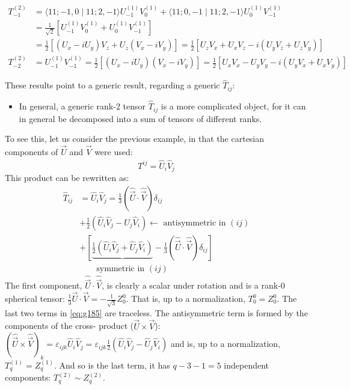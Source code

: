 \documentclass[12pt]{article}
\newcommand{\be}{\begin{equation}}
\newcommand{\ee}{\end{equation}}
\begin{document}
\[\begin{aligned}
%
T_{-1}^{(2)} &=\langle 11 ;-1,0 \mid 11 ; 2,-1\rangle U_{-1}^{(1)} V_{0}^{(1)}+\langle 11 ; 0,-1 \mid 11 ; 2,-1\rangle U_{0}^{(1)} V_{-1}^{(1)} \\ &=\frac{1}{\sqrt{2}}\left[U_{-1}^{(1)} V_{0}^{(1)}+U_{0}^{(1)} V_{-1}^{(1)}\right] \\ &=\frac{1}{2}\left[\left(U_{x}-i U_{y}\right) V_{z}+U_{z}\left(V_{x}-i V_{y}\right)\right]=\frac{1}{2}\left[U_{z} V_{x}+U_{x} V_{z}-i\left(U_{y} V_{z}+U_{z} V_{y}\right)\right] \\ 
%
T_{-2}^{(2)} &=U_{-1}^{(1)} V_{-1}^{(1)}=\frac{1}{2}\left[\left(U_{x}-i U_{y}\right)\left(V_{x}-i V_{y}\right)\right]=\frac{1}{2}\left[U_{x} V_{x}-U_{y} V_{y}-i\left(U_{y} V_{x}+U_{x} V_{y}\right)\right] \end{aligned}
\]

\clearpage



These results point to a generic result, regarding a generic $\hat{T}_{ij}$:
\begin{itemize}
\item In general, a generic rank-2 tensor \(\hat{T}_{i j}\)
is a more complicated object, for it can
in general be decomposed into a sum of
tensors of different ranks.
\end{itemize}
To see this, let us consider the previous example,
in that the cartesian components of \(\vec{U}\) and \(\vec{V}\) were used:
\setcounter{equation}{183}
\be
T^{\hat{ij}}=\hat{U}_{i} \hat{V}_{j}
\ee
This product can be rewritten as:
\be
\begin{aligned}
\hat{T}_{i j}
&=\hat{U}_{i} \hat{V}_{j}=\frac{1}{3}(\hat{\vec{U}} \cdot \hat{\vec{V}}) \delta_{i j}\\
&+\frac{1}{2}\left(\hat{U}_{i} \hat{V}_{j}-\hat{U}_{j} \hat{V}_{i}\right) \leftarrow \text{ antisymmetric in }(ij)\\
&+\left[\underbrace{\frac{1}{2}\left(\hat{U}_{i} \hat{V}_{j}+\hat{U}_{j} \hat{V}_{i}\right)}-\frac{1}{3}(\hat{\vec{U}} \cdot \hat{\vec{V}}) \delta_{i j}\right]\\
&\quad\quad\text{symmetric in }(ij)
\label{eq:g185}
\end{aligned}
\ee
The first component, $\hat{\vec{U}} \cdot \hat{\vec{V}}$, is clearly a scalar under
rotation and is a rank-0 spherical tensor: $\frac{1}{3}\vec{U}\cdot\vec{V} = -\frac{1}{\sqrt{3}}Z_0^{0}$.
That is, up to a normalization, $T_0^{0} = Z_0^{0}$. The last
two terms in %
{\eqref{eq:g185}} are traceless. The antisymmetric
term is formed by the components of the cross-%
product ($\vec{U}\times\vec{V}$): $(\hat{\vec{U}}\times\hat{\vec{V}})_k = \varepsilon_{ijk}\hat{U}_i\hat{V}_j = \varepsilon_{ijk} \frac{1}{2} (\hat{U}_i\hat{V}_j-\hat{U}_j\hat{V}_i)$
and is, up to a normalization, $T_q^{(1)} = Z_q^{(1)}$. And so is
the last term, it has $q-3-1=5$ independent
components: $T_q^{(2)} \sim Z_q^{(2)}$.
\end{document}

